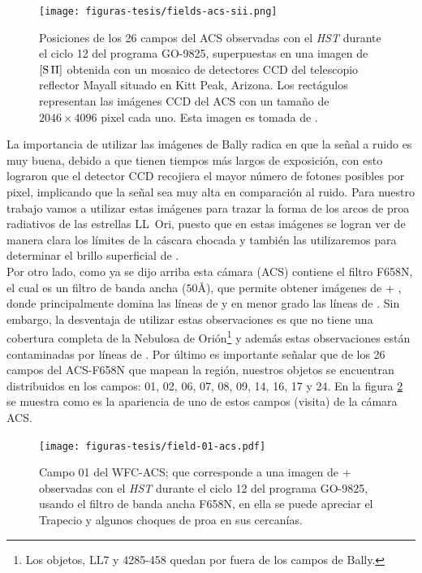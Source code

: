 \begin{figure}
  \centering
  \texttt{[image: figuras-tesis/fields-acs-sii.png]}
  \caption{Posiciones de los 26 campos del ACS observadas con el \textit{HST} durante el ciclo 12 del programa GO-9825, superpuestas en una imagen de \(\mathrm{[S\,II]}\) obtenida con un mosaico de detectores CCD del telescopio reflector Mayall situado en Kitt Peak, Arizona. Los rectágulos representan las imágenes CCD del ACS con un tamaño de \(2046 \times 4096\) pixel cada uno. Esta imagen es tomada de \citet{Bally:2006a}.}
  \label{fig:fields}
\end{figure}

La importancia de utilizar las imágenes de Bally radica en que la señal a ruido es muy buena, debido a que tienen tiempos más largos de exposición, con esto  lograron que el detector CCD recojiera el mayor número de fotones posibles por pixel, implicando que la señal sea muy alta en comparación al ruido. Para nuestro trabajo vamos a utilizar estas imágenes para trazar la forma de los arcos de proa radiativos de las estrellas LL~Ori, puesto que en estas imágenes se logran ver de manera clara los límites de la cáscara chocada y también las utilizaremos para determinar el brillo superficial de \ha{}.\\

Por otro lado, como ya se dijo arriba esta cámara (ACS) contiene el filtro F658N, el cual es un filtro de banda ancha (\(50 \text{Å}\)), que permite obtener imágenes de \ha{} + \nii{}, donde principalmente domina las líneas de \ha{} y en menor grado las líneas de \nii{}. Sin embargo, la desventaja de utilizar estas observaciones es que no tiene una cobertura completa de la Nebulosa de Orión\footnote{Los objetos, LL7 y 4285-458 quedan por fuera de los campos de Bally.} y además estas observaciones están contaminadas por líneas de \nii{}. Por último es importante señalar que de los 26 campos del ACS-F658N que mapean la región, nuestros objetos se encuentran distribuidos en los campos: 01, 02, 06, 07, 08, 09, 14, 16, 17 y 24. En la figura \ref{fig:field-01} se muestra como es la apariencia de uno de estos campos (visita) de la cámara ACS.\\

\begin{figure}
  \centering
  \texttt{[image: figuras-tesis/field-01-acs.pdf]}
  \caption{Campo 01 del WFC-ACS; que corresponde a una imagen de \ha{}+\nii{} observadas con el \textit{HST} durante el ciclo 12 del programa GO-9825, usando el filtro de banda ancha F658N, en ella se puede apreciar el Trapecio y algunos choques de proa en sus cercanías.}
  \label{fig:field-01}
\end{figure}

